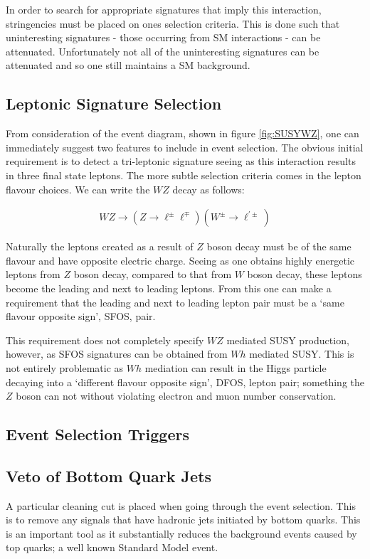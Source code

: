 \noindent In order to search for appropriate signatures that imply this interaction, stringencies must be placed on ones selection criteria. 
This is done such that uninteresting signatures - those occurring from SM interactions - can be attenuated.
Unfortunately not all of the uninteresting signatures can be attenuated and so one still maintains a SM background.

\subsection{Leptonic Signature Selection}
From consideration of the event diagram, shown in figure \ref{fig:SUSYWZ}, one can immediately suggest two features to include in event selection.
The obvious initial requirement is to detect a tri-leptonic signature seeing as this interaction results in three final state leptons.
The more subtle selection criteria comes in the lepton flavour choices.
We can write the $WZ$ decay as follows:

\begin{align}
WZ \rightarrow \left(Z \rightarrow \ell^{\pm} \ell^{\mp} \right) \left(W^{\pm} \rightarrow \ell^{\prime \pm}\right)
\end{align}

\noindent Naturally the leptons created as a result of $Z$ boson decay must be of the same flavour and have opposite electric charge.
Seeing as one obtains highly energetic leptons from $Z$ boson decay, compared to that from $W$ boson decay, these leptons become the leading and next to leading leptons. 
From this one can make a requirement that the leading and next to leading lepton pair must be a `same flavour opposite sign', SFOS, pair.

This requirement does not completely specify $WZ$ mediated SUSY production, however, as SFOS signatures can be obtained from $Wh$ mediated SUSY.
This is not entirely problematic as $Wh$ mediation can result in the Higgs particle decaying into a `different flavour opposite sign', DFOS, lepton pair; something the $Z$ boson can not without violating electron and muon number conservation.

\subsection{Event Selection Triggers}

\subsection{Veto of Bottom Quark Jets}
A particular cleaning cut is placed when going through the event selection.
This is to remove any signals that have hadronic jets initiated by bottom quarks.
This is an important tool as it substantially reduces the background events caused by top quarks; a well known Standard Model event.

